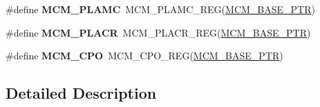 \begin{DoxyCompactItemize}
\item 
\hypertarget{group___m_c_m___register___accessor___macros_ga63f36c9c5700eb5fca4fe3852e1d6dfd}{}\#define {\bfseries M\+C\+M\+\_\+\+P\+L\+A\+M\+C}~M\+C\+M\+\_\+\+P\+L\+A\+M\+C\+\_\+\+R\+E\+G(\hyperlink{group___m_c_m___peripheral_gad41e931f176c230831e3dbad45117841}{M\+C\+M\+\_\+\+B\+A\+S\+E\+\_\+\+P\+T\+R})\label{group___m_c_m___register___accessor___macros_ga63f36c9c5700eb5fca4fe3852e1d6dfd}

\item 
\hypertarget{group___m_c_m___register___accessor___macros_gaa410b4b505027d7ff0aab20f87e2c2a5}{}\#define {\bfseries M\+C\+M\+\_\+\+P\+L\+A\+C\+R}~M\+C\+M\+\_\+\+P\+L\+A\+C\+R\+\_\+\+R\+E\+G(\hyperlink{group___m_c_m___peripheral_gad41e931f176c230831e3dbad45117841}{M\+C\+M\+\_\+\+B\+A\+S\+E\+\_\+\+P\+T\+R})\label{group___m_c_m___register___accessor___macros_gaa410b4b505027d7ff0aab20f87e2c2a5}

\item 
\hypertarget{group___m_c_m___register___accessor___macros_ga96a3cf196007edffa1d1ee83717073da}{}\#define {\bfseries M\+C\+M\+\_\+\+C\+P\+O}~M\+C\+M\+\_\+\+C\+P\+O\+\_\+\+R\+E\+G(\hyperlink{group___m_c_m___peripheral_gad41e931f176c230831e3dbad45117841}{M\+C\+M\+\_\+\+B\+A\+S\+E\+\_\+\+P\+T\+R})\label{group___m_c_m___register___accessor___macros_ga96a3cf196007edffa1d1ee83717073da}

\end{DoxyCompactItemize}


\subsection{Detailed Description}
